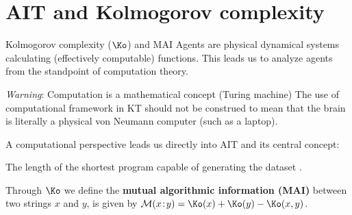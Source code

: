 \section{AIT and Kolmogorov complexity}
\begin{frame}[label=intro3]{Kolmogorov complexity ($\Ko$) and MAI}
 Agents are physical dynamical systems calculating (effectively computable) functions.   This leads us to analyze agents from the standpoint of computation theory.
 \begin{alertblock}{\textit{Warning}: Computation is a mathematical concept (Turing machine)}
The use of computational framework in KT should not be construed to mean that the brain is literally a physical von Neumann computer (such as a laptop).
\end{alertblock}\vfill 
 
A computational perspective  leads us directly into AIT and its central concept: 


\begin{definition}
The length of the shortest program capable of generating  the dataset \citep{Kolomgorov1965}.  
\end{definition} \vfill
Through  $\Ko$ we define the \textbf{mutual algorithmic information  (MAI)} between two strings $x$ and $y$, is given by\citep{Li:1997aa, Grunwald:2004aa}   
$
 \mathcal M(x \!:\!y) = \Ko(x) +\Ko(y)- \Ko(x,y)
$.
\end{frame}





